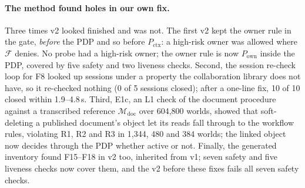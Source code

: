 \documentclass[sigconf,review,anonymous]{acmart}
\newcommand{\Px}{P_{\mathrm{ctx}}}
\newcommand{\Po}{P_{\mathrm{own}}}
\begin{document}
\smallskip\noindent{}

\paragraph{The method found holes in our own fix.} Three times v2 looked finished and was not. The first v2 kept the
owner rule in the gate, \emph{before} the PDP and so before $\Px$: a high-risk owner was allowed where $\mathcal{F}$
denies. No probe had a high-risk owner; the owner rule is now $\Po$ inside the PDP, covered by five safety and two
liveness checks. Second, the session re-check loop for F8 looked up
sessions under a property the collaboration library does not have, so it re-checked nothing (0 of 5 sessions closed);
after a one-line fix, 10 of 10 closed within 1.9--4.8\,s. Third, E1c, an L1 check of the document procedure against a
transcribed reference $\mathcal{M}_{\mathrm{doc}}$ over 604{,}800 worlds, showed that soft-deleting a published
document's object let its reads fall through to the workflow rules, violating R1, R2 and R3 in 1{,}344, 480 and 384
worlds; the linked object now decides through the PDP whether active or not. Finally, the generated inventory found
F15--F18 in v2 too, inherited from v1; seven safety and five liveness checks now cover them, and the v2 before these
fixes fails all seven safety checks.
\end{document}
